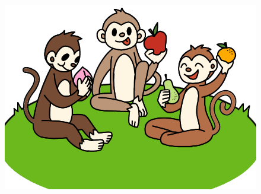 \begin{multicols}{2}
\begin{figure}[H]
			\includegraphics[width=1\linewidth]{b6}
			\vspace*{-5pt}
		\end{figure}
\end{multicols}
\newpage
\begingroup
{} 
\centering
\endgroup
\vspace*{65pt}

